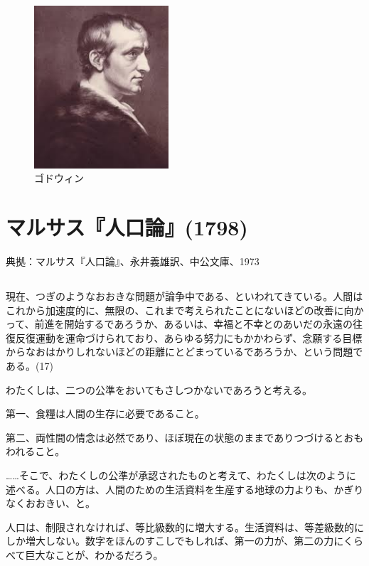  \begin{figure}[htbp]
   \centering
     \includegraphics[width=50mm]{images/godwin.jpg}
   \caption{ゴドウィン}
 \end{figure}



\section{マルサス『人口論』(1798)}



典拠：マルサス『人口論』、永井義雄訳、中公文庫、1973



\subsection{}




現在、つぎのようなおおきな問題が論争中である、といわれてきている。人間はこれから加速度的に、無限の、これまで考えられたことにないほどの改善に向かって、前進を開始するであろうか、あるいは、幸福と不幸とのあいだの永遠の往復反復運動を運命づけられており、あらゆる努力にもかかわらず、念願する目標からなおはかりしれないほどの距離にとどまっているであろうか、という問題である。(17)



わたくしは、二つの公準をおいてもさしつかないであろうと考える。

第一、食糧は人間の生存に必要であること。

第二、両性間の情念は必然であり、ほぼ現在の状態のままでありつづけるとおもわれること。


……そこで、わたくしの公準が承認されたものと考えて、わたくしは次のように述べる。人口の方は、人間のための生活資料を生産する地球の力よりも、かぎりなくおおきい、と。

人口は、制限されなければ、等比級数的に増大する。生活資料は、等差級数的にしか増大しない。数字をほんのすこしでもしれば、第一の力が、第二の力にくらべて巨大なことが、わかるだろう。

